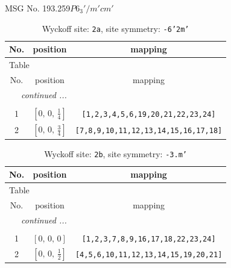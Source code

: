 \documentclass[fleqn,8pt]{jsarticle}
\begin{document}
\setcounter{MaxMatrixCols}{32}

\renewcommand{\tablename}{Table~}
\renewcommand{\figurename}{Figure~}
\begin{center}
\LARGE
MSG No. 193.259\quad$P6_{3}'/m'cm'$
\end{center}
\renewcommand{\arraystretch}{1.2}
\begin{longtable}{ccc}
\caption{Wyckoff site: {\tt 2a}, site symmetry: {\tt -6'2m'}}
 \\
 \hline \hline
No. & position & mapping \\ \hline \endfirsthead

\multicolumn{2}{l}{\tablename\ \thetable{}} \\
 \hline \hline
No. & position & mapping \\ \hline \endhead

 \hline \hline
\multicolumn{2}{r}{\footnotesize\it continued ...} \\ \endfoot

 \hline \hline
\multicolumn{2}{r}{} \\ \endlastfoot

1 & $\left[ 0,\, 0,\, \frac{1}{4} \right]$ & {\tt [1,2,3,4,5,6,19,20,21,22,23,24]} \\ \hline
2 & $\left[ 0,\, 0,\, \frac{3}{4} \right]$ & {\tt [7,8,9,10,11,12,13,14,15,16,17,18]} \\
\end{longtable}
\renewcommand{\arraystretch}{1.2}
\begin{longtable}{ccc}
\caption{Wyckoff site: {\tt 2b}, site symmetry: {\tt -3.m'}}
 \\
 \hline \hline
No. & position & mapping \\ \hline \endfirsthead

\multicolumn{2}{l}{\tablename\ \thetable{}} \\
 \hline \hline
No. & position & mapping \\ \hline \endhead

 \hline \hline
\multicolumn{2}{r}{\footnotesize\it continued ...} \\ \endfoot

 \hline \hline
\multicolumn{2}{r}{} \\ \endlastfoot

1 & $\left[ 0,\, 0,\, 0 \right]$ & {\tt [1,2,3,7,8,9,16,17,18,22,23,24]} \\ \hline
2 & $\left[ 0,\, 0,\, \frac{1}{2} \right]$ & {\tt [4,5,6,10,11,12,13,14,15,19,20,21]} \\
\end{longtable}
\end{document}
